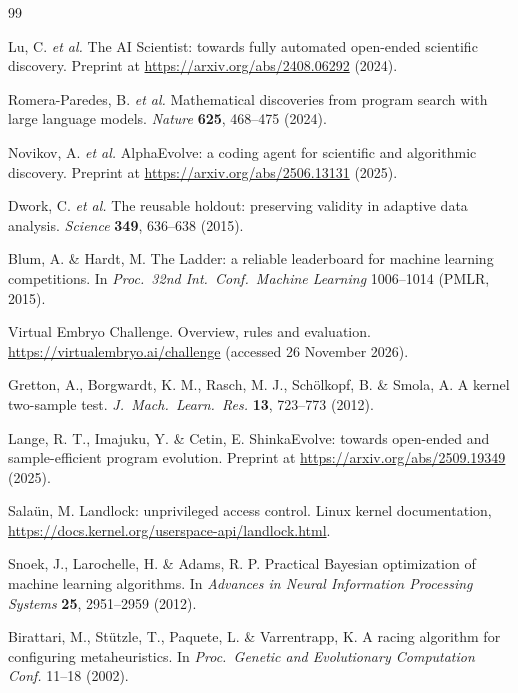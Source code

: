 \documentclass[9pt,twocolumn,a4paper]{extarticle}
\begin{document}
{\sffamily\fontsize{7.1}{8.7}\selectfont
\begin{thebibliography}{99}
\setlength{\itemsep}{1.5pt}

 Lu, C. \emph{et al.} The AI Scientist: towards fully automated open-ended scientific
discovery. Preprint at \url{https://arxiv.org/abs/2408.06292} (2024).

 Romera-Paredes, B. \emph{et al.} Mathematical discoveries from program search with large
language models. \emph{Nature} \textbf{625}, 468--475 (2024).

 Novikov, A. \emph{et al.} AlphaEvolve: a coding agent for scientific and algorithmic
discovery. Preprint at \url{https://arxiv.org/abs/2506.13131} (2025).

 Dwork, C. \emph{et al.} The reusable holdout: preserving validity in adaptive data
analysis. \emph{Science} \textbf{349}, 636--638 (2015).

 Blum, A. \& Hardt, M. The Ladder: a reliable leaderboard for machine learning competitions.
In \emph{Proc.\ 32nd Int.\ Conf.\ Machine Learning} 1006--1014 (PMLR, 2015).

 Virtual Embryo Challenge. Overview, rules and evaluation. \url{https://virtualembryo.ai/challenge}
(accessed 26 November 2026).

 Gretton, A., Borgwardt, K. M., Rasch, M. J., Sch\"olkopf, B. \& Smola, A. A kernel
two-sample test. \emph{J.\ Mach.\ Learn.\ Res.} \textbf{13}, 723--773 (2012).

 Lange, R. T., Imajuku, Y. \& Cetin, E. ShinkaEvolve: towards open-ended and sample-efficient
program evolution. Preprint at \url{https://arxiv.org/abs/2509.19349} (2025).

 Sala\"un, M. Landlock: unprivileged access control. Linux kernel documentation,
\url{https://docs.kernel.org/userspace-api/landlock.html}.

 Snoek, J., Larochelle, H. \& Adams, R. P. Practical Bayesian optimization of machine
learning algorithms. In \emph{Advances in Neural Information Processing Systems} \textbf{25}, 2951--2959 (2012).

 Birattari, M., St\"utzle, T., Paquete, L. \& Varrentrapp, K. A racing algorithm for
configuring metaheuristics. In \emph{Proc.\ Genetic and Evolutionary Computation Conf.} 11--18 (2002).


\end{thebibliography}}
\end{document}
